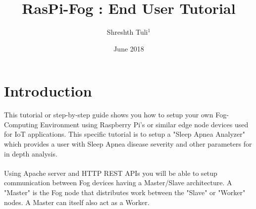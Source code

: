 \documentclass{article}
\title{RasPi-Fog : End User Tutorial}
\author{Shreshth Tuli$^{1}$}
\date{June 2018}
\begin{document}
\maketitle

\section{Introduction}
This tutorial or step-by-step guide shows you how to setup your own Fog-Computing Environment using Raspberry Pi's or similar edge node devices used for IoT applications. This specific tutorial is to setup a "Sleep Apnea Analyzer" which provides a user with Sleep Apnea disease severity and other parameters for in depth analysis.\\ \\
Using Apache server and HTTP REST APIs you will be able to setup communication between Fog devices having a Master/Slave architecture. A "Master" is the Fog node that distributes work between the "Slave" or "Worker" nodes. A Master can itself also act as a Worker. 
\end{document}

